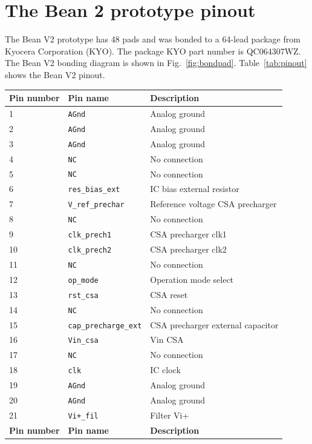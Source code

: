 \chapter{The Bean 2 prototype pinout} 
\label{appendix1}
The Bean V2 prototype has 48 pads and was bonded to a 64-lead package from \mbox{Kyocera} Corporation (KYO). The package KYO part number is QC064307WZ. The Bean V2 bonding diagram is shown in Fig.~\ref{fig:bondpad}.
Table~\ref{tab:pinout} shows the Bean V2 pinout.

\begin{center}
\begin{longtable}{|l|l|l|}\hline
{\bf Pin number} & {\bf Pin name} & {\bf Description} \\ \hline\hline
1 & \verb=AGnd= & Analog ground \\\hline
2 & \verb=AGnd= & Analog ground \\\hline
3 & \verb=AGnd= & Analog ground \\\hline
4 & \verb=NC= & No connection \\\hline
5 & \verb=NC= & No connection \\\hline
6 & \verb=res_bias_ext= & IC bias external resistor \\\hline
7 & \verb=V_ref_prechar= & Reference voltage CSA precharger \\\hline
8 & \verb=NC= & No connection  \\\hline
9 &  \verb=clk_prech1= & CSA precharger clk1  \\\hline
10 & \verb=clk_prech2= & CSA precharger clk2  \\\hline
11 & \verb=NC= & No connection \\\hline
12 & \verb=op_mode= & Operation mode select \\\hline
13 & \verb=rst_csa= & CSA reset  \\\hline
14 & \verb=NC= & No connection \\\hline
15 & \verb=cap_precharge_ext= & CSA precharger external capacitor \\\hline
16 & \verb=Vin_csa= & Vin CSA \\\hline
17 & \verb=NC= & No connection \\\hline
18 & \verb=clk= & IC clock \\\hline
19 & \verb=AGnd= & Analog ground \\\hline
20 & \verb=AGnd= & Analog ground \\\hline
21 & \verb=Vi+_fil= & Filter Vi+ \\\hline
{\bf Pin number} & {\bf Pin name} & {\bf Description} \\ \hline\hline

\end{longtable}
\end{center}
